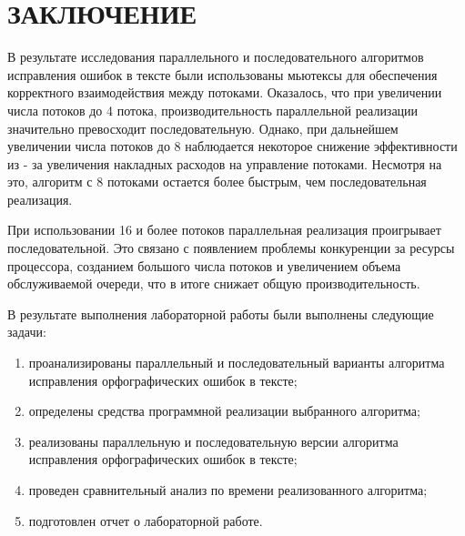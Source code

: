 \chapter*{\hfill{\centering ЗАКЛЮЧЕНИЕ}\hfill}

В результате исследования параллельного и последовательного алгоритмов исправления ошибок в тексте были использованы мьютексы для обеспечения корректного взаимодействия между потоками. 
Оказалось, что при увеличении числа потоков до 4 потока, производительность параллельной реализации значительно превосходит последовательную. 
Однако, при дальнейшем увеличении числа потоков до 8 наблюдается некоторое снижение эффективности из - за увеличения накладных расходов на управление потоками. 
Несмотря на это, алгоритм с 8 потоками остается более быстрым, чем последовательная реализация.

При использовании 16 и более потоков параллельная реализация проигрывает последовательной. 
Это связано с появлением проблемы конкуренции за ресурсы процессора, созданием большого числа потоков и увеличением объема обслуживаемой очереди, что в итоге снижает общую производительность.

В результате выполнения лабораторной работы были выполнены следующие задачи:

\begin{enumerate}[label={\arabic*)}]
	\item проанализированы параллельный и последовательный варианты алгоритма исправления орфографических ошибок в тексте;
	\item определены средства программной реализации выбранного алгоритма;
	\item реализованы параллельную и последовательную версии алгоритма исправления орфографических ошибок в тексте;
	\item проведен сравнительный анализ по времени реализованного алгоритма;
	\item подготовлен отчет о лабораторной работе.
\end{enumerate}
